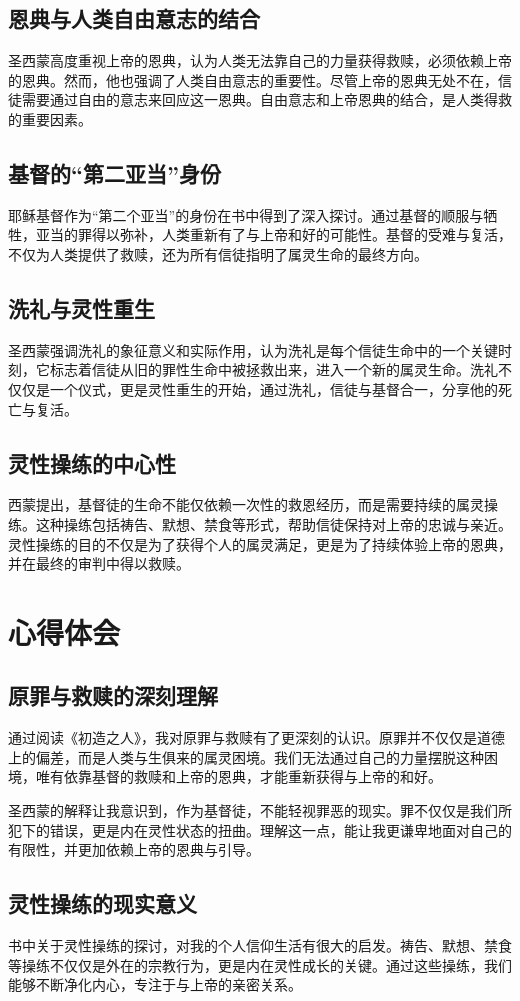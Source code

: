 \documentclass[12pt, a4paper]{ctexart}
\begin{document}
\subsection{恩典与人类自由意志的结合}
圣西蒙高度重视上帝的恩典，认为人类无法靠自己的力量获得救赎，必须依赖上帝的恩典。然而，他也强调了人类自由意志的重要性。尽管上帝的恩典无处不在，信徒需要通过自由的意志来回应这一恩典。自由意志和上帝恩典的结合，是人类得救的重要因素。
\subsection{基督的“第二亚当”身份}
耶稣基督作为“第二个亚当”的身份在书中得到了深入探讨。通过基督的顺服与牺牲，亚当的罪得以弥补，人类重新有了与上帝和好的可能性。基督的受难与复活，不仅为人类提供了救赎，还为所有信徒指明了属灵生命的最终方向。
\subsection{洗礼与灵性重生}
圣西蒙强调洗礼的象征意义和实际作用，认为洗礼是每个信徒生命中的一个关键时刻，它标志着信徒从旧的罪性生命中被拯救出来，进入一个新的属灵生命。洗礼不仅仅是一个仪式，更是灵性重生的开始，通过洗礼，信徒与基督合一，分享他的死亡与复活。
\subsection{灵性操练的中心性}
西蒙提出，基督徒的生命不能仅依赖一次性的救恩经历，而是需要持续的属灵操练。这种操练包括祷告、默想、禁食等形式，帮助信徒保持对上帝的忠诚与亲近。灵性操练的目的不仅是为了获得个人的属灵满足，更是为了持续体验上帝的恩典，并在最终的审判中得以救赎。

\section{心得体会}
\subsection{原罪与救赎的深刻理解}
通过阅读《初造之人》，我对原罪与救赎有了更深刻的认识。原罪并不仅仅是道德上的偏差，而是人类与生俱来的属灵困境。我们无法通过自己的力量摆脱这种困境，唯有依靠基督的救赎和上帝的恩典，才能重新获得与上帝的和好。

圣西蒙的解释让我意识到，作为基督徒，不能轻视罪恶的现实。罪不仅仅是我们所犯下的错误，更是内在灵性状态的扭曲。理解这一点，能让我更谦卑地面对自己的有限性，并更加依赖上帝的恩典与引导。
\subsection{灵性操练的现实意义}
书中关于灵性操练的探讨，对我的个人信仰生活有很大的启发。祷告、默想、禁食等操练不仅仅是外在的宗教行为，更是内在灵性成长的关键。通过这些操练，我们能够不断净化内心，专注于与上帝的亲密关系。
\end{document}
